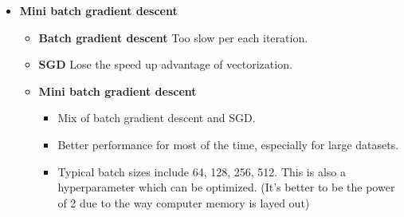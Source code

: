 \begin{itemize}
    \item \textbf{Mini batch gradient descent}
    \begin{itemize}
        \item \textbf{Batch gradient descent} Too slow per each iteration. 
        \item \textbf{SGD} Lose the speed up advantage of vectorization.
        \item \textbf{Mini batch gradient descent} 
        \begin{itemize}
            \item Mix of batch gradient descent and SGD.
            \item Better performance for most of the time, especially for large datasets. 
            \item Typical batch sizes include 64, 128, 256, 512. This is also a hyperparameter which can be optimized. (It's better to be the power of 2 due to the way computer memory is layed out)
        \end{itemize}
    \end{itemize}
    

\end{itemize}
